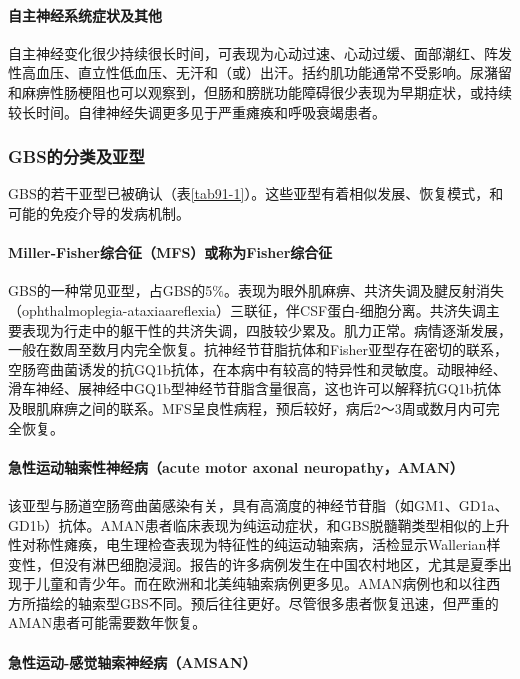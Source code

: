 \paragraph{自主神经系统症状及其他}

自主神经变化很少持续很长时间，可表现为心动过速、心动过缓、面部潮红、阵发性高血压、直立性低血压、无汗和（或）出汗。括约肌功能通常不受影响。尿潴留和麻痹性肠梗阻也可以观察到，但肠和膀胱功能障碍很少表现为早期症状，或持续较长时间。自律神经失调更多见于严重瘫痪和呼吸衰竭患者。

\subsubsection{GBS的分类及亚型}

GBS的若干亚型已被确认（表\ref{tab91-1}）。这些亚型有着相似发展、恢复模式，和可能的免疫介导的发病机制。

\paragraph{Miller-Fisher综合征（MFS）或称为Fisher综合征}

GBS的一种常见亚型，占GBS的5\%。表现为眼外肌麻痹、共济失调及腱反射消失（ophthalmoplegia-ataxiaareflexia）三联征，伴CSF蛋白-细胞分离。共济失调主要表现为行走中的躯干性的共济失调，四肢较少累及。肌力正常。病情逐渐发展，一般在数周至数月内完全恢复。抗神经节苷脂抗体和Fisher亚型存在密切的联系，空肠弯曲菌诱发的抗GQ1b抗体，在本病中有较高的特异性和灵敏度。动眼神经、滑车神经、展神经中GQ1b型神经节苷脂含量很高，这也许可以解释抗GQ1b抗体及眼肌麻痹之间的联系。MFS呈良性病程，预后较好，病后2～3周或数月内可完全恢复。

\paragraph{急性运动轴索性神经病（acute motor axonal neuropathy，AMAN）}

该亚型与肠道空肠弯曲菌感染有关，具有高滴度的神经节苷脂（如GM1、GD1a、GD1b）抗体。AMAN患者临床表现为纯运动症状，和GBS脱髓鞘类型相似的上升性对称性瘫痪，电生理检查表现为特征性的纯运动轴索病，活检显示Wallerian样变性，但没有淋巴细胞浸润。报告的许多病例发生在中国农村地区，尤其是夏季出现于儿童和青少年。而在欧洲和北美纯轴索病例更多见。AMAN病例也和以往西方所描绘的轴索型GBS不同。预后往往更好。尽管很多患者恢复迅速，但严重的AMAN患者可能需要数年恢复。

\paragraph{急性运动-感觉轴索神经病（AMSAN）}

